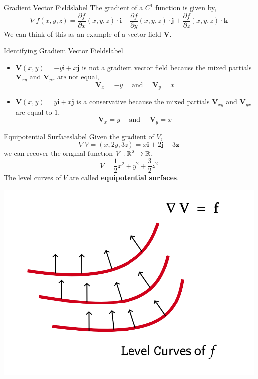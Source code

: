 \begin{ex}{Gradient Vector Fields}{label}
	The gradient of a $C^1$ function is given by,
	\[\nabla f(x, y, z)=\frac{\partial f}{\partial x}(x, y, z) \cdot \mathbf{i}+\frac{\partial f}{\partial y}(x, y, z) \cdot \mathbf{j}+\frac{\partial f}{\partial z}(x, y, z) \cdot  \mathbf{k}\]
	We can think of this as an example of a vector field $\mathbf{V}$.
\end{ex}

\begin{ex}{Identifying Gradient Vector Fields}{label}
	\begin{itemize}
		\item $\mathbf{V}(x, y) = -y \mathbf{i} + x \mathbf{j} $ is not a gradient vector field because the mixed partials $\mathbf{V}_{xy}$ and $\mathbf{V}_{yx}$ are not equal,
		\[\mathbf{V}_x = -y \quad \text{ and } \quad \mathbf{V}_y = x\]
		\item $\mathbf{V}(x, y) = y \mathbf{i} + x \mathbf{j} $ is a conservative because the mixed partials $\mathbf{V}_{xy}$ and $\mathbf{V}_{yx}$ are equal to $1$,
		\[\mathbf{V}_x = y \quad \text{ and } \quad \mathbf{V}_y = x\]
	\end{itemize}
\end{ex}

\begin{ex}{Equipotential Surfaces}{label}
	Given the gradient of $V$,
	\[\nabla V = (x, 2y, 3z) = x \mathbf{i} + 2 \mathbf{j} + 3 \mathbf{z}\]
	we can recover the original function $V: \mathbb{R}^2 \rightarrow \mathbb{R}$,
	\[V = \frac{1}{2}x^2 + y^2 + \frac{3}{2}z^2\]
	The level curves of $V$ are called \textbf{equipotential surfaces}.
\end{ex}

\begin{marginfigure}
	\begin{center}
	    \includegraphics[width=0.7\linewidth]{figures/wk-5/fig-1.png}
	\end{center}
\end{marginfigure}

